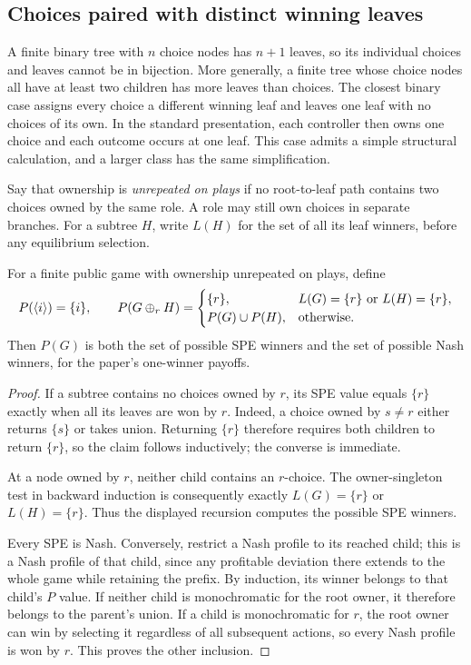 \subsection{Choices paired with distinct winning leaves}\label{app:contexts-unrepeated}

A finite binary tree with $n$ choice nodes has $n+1$ leaves, so its
individual choices and leaves cannot be in bijection. More generally,
a finite tree whose choice nodes all have at least two children has
more leaves than choices. The closest binary case assigns every choice
a different winning leaf and leaves one leaf with no choices of its
own. In the standard presentation, each controller then owns one
choice and each outcome occurs at one leaf. This case admits a simple
structural calculation, and a larger class has the same simplification.

Say that ownership is \emph{unrepeated on plays} if no root-to-leaf
path contains two choices owned by the same role. A role may still own
choices in separate branches. For a subtree $H$, write $L(H)$ for
the set of all its leaf winners, before any equilibrium selection.

\begin{proposition}\label{context:prop:unrepeated}
For a finite public game with ownership unrepeated on plays, define
\[
 P(\langle i\rangle)=\{i\},\qquad
 P(G\mathbin{\oplus_{r}} H)=
 \begin{cases}
 \{r\},&L(G)=\{r\}\text{ or }L(H)=\{r\},\\
 P(G)\cup P(H),&\text{otherwise}.
 \end{cases}
\]
Then $P(G)$ is both the set of possible SPE winners and the set of
possible Nash winners, for the paper's one-winner payoffs.
\end{proposition}
\begin{proof}
If a subtree contains no choices owned by $r$, its SPE value equals
$\{r\}$ exactly when all its leaves are won by $r$. Indeed, a choice
owned by $s\ne r$ either returns $\{s\}$ or takes union. Returning
$\{r\}$ therefore requires both children to return $\{r\}$, so the
claim follows inductively; the converse is immediate.

At a node owned by $r$, neither child contains an $r$-choice. The
owner-singleton test in backward induction is consequently exactly
$L(G)=\{r\}$ or $L(H)=\{r\}$. Thus the displayed recursion computes
the possible SPE winners.

Every SPE is Nash. Conversely, restrict a Nash profile to its reached
child; this is a Nash profile of that child, since any profitable
deviation there extends to the whole game while retaining the prefix.
By induction, its winner belongs to that child's $P$ value. If neither
child is monochromatic for the root owner, it therefore belongs to
the parent's union. If a child is monochromatic for $r$, the root
owner can win by selecting it regardless of all subsequent actions,
so every Nash profile is won by $r$. This proves the other inclusion.
\end{proof}

